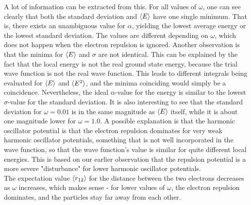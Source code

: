 \documentclass[10pt,a4paper]{article}
\begin{document}
A lot of information can be extracted from this. For all values of $\omega$, one can see clearly that both the standard deviation and $\braket{E}$ have one single minimum. That is, there exists an unambiguous value for $\alpha$, yielding the lowest average energy or the lowest standard deviation. The values are different depending on $\omega$, which does not happen when the electron repulsion is ignored. Another observation is that the minima for $\braket{E}$ and $\sigma$ are not identical. This can be explained by the fact that the local energy is not the real ground state energy, because the trial wave function is not the real wave function. This leads to different integrals being evaluated for $\braket{E}$ and $\braket{E^2}$, and the minima coinciding would simply be a coincidence. Nevertheless, the ideal $\alpha$-value for the energy is similar to the lowest $\sigma$-value for the standard deviation. It is also interesting to see that the standard deviation for $\omega=0.01$ is in the same magnitude as $\braket{E}$ itself, while it is about one magnitude lower for $\omega=1.0$. A possible explanation is that the harmonic oscillator potential is that the electron repulsion dominates for very weak harmonic oscillator potentials, something that is not well incorporated in the wave function, so that the wave function's value is similar for quite different local energies. This is based on our earlier observation that the repulsion potential is a more severe "disturbance" for lower harmonic oscillator potentials.\\
The expectation value $\braket{r_{12}}$ for the distance between the two electrons decreases as $\omega$ increases, which makes sense - for lower values of  $\omega$, the electron repulsion dominates, and the particles stay far away from each other. 
\end{document}
